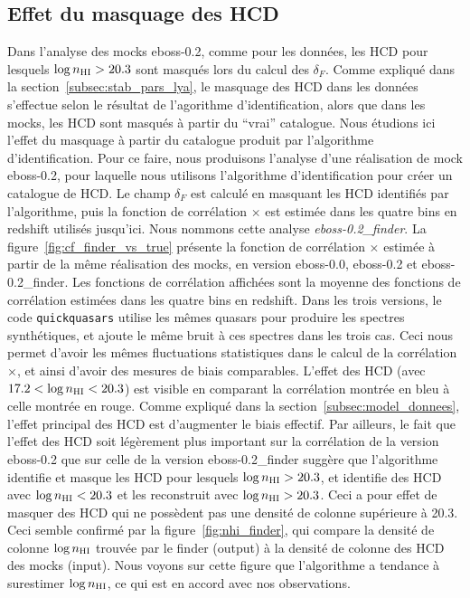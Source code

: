 \documentclass[11pt, twoside, a4paper, openright]{report}
\begin{document}
\subsection{Effet du masquage des HCD}

Dans l'analyse des mocks eboss-0.2, comme pour les données, les HCD pour lesquels $\log n_{\textsc{HI}} > \num{20.3}$ sont masqués lors du calcul des $\delta_F$. Comme expliqué dans la section~\ref{subsec:stab_pars_lya}, le masquage des HCD dans les données s'effectue selon le résultat de l'agorithme d'identification, alors que dans les mocks, les HCD sont masqués à partir du ``vrai'' catalogue. Nous étudions ici l'effet du masquage à partir du catalogue produit par l'algorithme d'identification.
Pour ce faire, nous produisons l'analyse d'une réalisation de mock eboss-0.2, pour laquelle nous utilisons l'algorithme d'identification pour créer un catalogue de HCD. Le champ $\delta_F$ est calculé en masquant les HCD identifiés par l'algorithme, puis la fonction de corrélation \lya{}$\times$\lya{} est estimée dans les quatre bins en redshift utilisés jusqu'ici. Nous nommons cette analyse \emph{eboss-0.2\_finder}.
La figure~\ref{fig:cf_finder_vs_true} présente la fonction de corrélation \lya{}$\times$\lya{} estimée à partir de la même réalisation des mocks, en version eboss-0.0, eboss-0.2 et eboss-0.2\_finder.
Les fonctions de corrélation affichées sont la moyenne des fonctions de corrélation estimées dans les quatre bins en redshift.
Dans les trois versions, le code \texttt{quickquasars} utilise les mêmes quasars pour produire les spectres synthétiques, et ajoute le même bruit à ces spectres dans les trois cas. Ceci nous permet d'avoir les mêmes fluctuations statistiques dans le calcul de la corrélation \lya{}$\times$\lya{}, et ainsi d'avoir des mesures de biais comparables.
L'effet des HCD (avec $\num{17.2} < \log n_{\textsc{HI}} < \num{20.3}$) est visible en comparant la corrélation montrée en bleu à celle montrée en rouge. Comme expliqué dans la section~\ref{subsec:model_donnees}, l'effet principal des HCD est d'augmenter le biais effectif.
Par ailleurs, le fait que l'effet des HCD soit légèrement plus important sur la corrélation de la version eboss-0.2 que sur celle de la version  eboss-0.2\_finder suggère que l'algorithme identifie et masque les HCD pour lesquels $\log n_{\textsc{HI}} > \num{20.3}$, et identifie des HCD avec $\log n_{\textsc{HI}} < \num{20.3}$ et les reconstruit avec $\log n_{\textsc{HI}} > \num{20.3}$. Ceci a pour effet de masquer des HCD qui ne possèdent pas une densité de colonne supérieure à \num{20.3}.
Ceci semble confirmé par la figure~\ref{fig:nhi_finder}, qui compare la densité de colonne $\log n_{\textsc{HI}}$ trouvée par le finder (output) à la densité de colonne des HCD des mocks (input). Nous voyons sur cette figure que l'algorithme a tendance à surestimer $\log n_{\textsc{HI}}$, ce qui est en accord avec nos observations.
\end{document}
